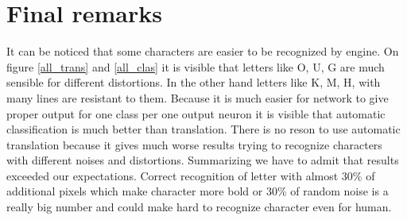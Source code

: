 \documentclass[a4paper]{article}
\begin{document}
\section{Final remarks}
It can be noticed that some characters are easier to be recognized by engine.
On figure \ref{all_trans} and \ref{all_clas} it is visible that letters like O, U, G are much sensible for different distortions. In the other hand letters like K, M, H, with many lines are resistant to them.
Because it is much easier for network to give proper output for one class per one output neuron it is visible that automatic classification is much better than translation. There is no reson to use automatic translation because it gives much worse results trying to recognize characters with different noises and distortions.
Summarizing we have to admit that results exceeded our expectations. Correct recognition of letter with almost 30\% of additional pixels which make character more bold or 30\% of random noise is a really big number and could make hard to recognize character even for human.
\end{document}
